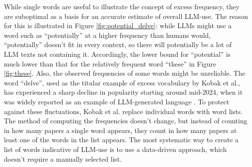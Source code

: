 While single words are useful to illustrate the concept of excess frequency, they are suboptimal as a basis for an accurate estimate of overall LLM-use.
The reason for this is illustrated in Figure \ref{fig:potential_delve}: while LLMs might use a word such as ``potentially'' at a higher frequency than humans would, ``potentially'' doesn't fit in every context, so there will potentially be a lot of LLM texts not containing it.
Accordingly, the lower bound for ``potential'' is much lower than that for the relatively frequent word ``these'' in Figure \ref{fig:these}.
Also, the observed frequencies of some words might be unreliable.
The word ``delve'', used as the titular example of excess vocabulary by Kobak et al., has experienced a sharp decline in popularity starting around mid-2024, when it was widely reported as an example of LLM-generated language \cite{Geng2025}.
To protect against these fluctuations, Kobak et al. replace individual words with word lists.
The method of computing the frequencies doesn't change, but instead of counting in how many papers a single word appears, they count in how many papers at least one of the words in the list appears.
The most systematic way to create a list of words indicative of LLM-use is to use a data-driven approach, which doesn't require a manually selected list.

